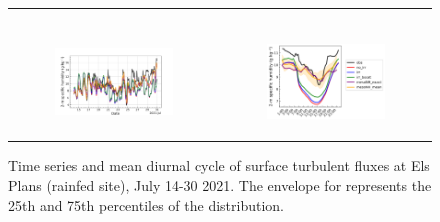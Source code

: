 \begin{figure}[hbtp]
\begin{tabular}{cc}
\begin{subfigure}[t]{0.5\textwidth}
        \end{subfigure} \\
        \begin{subfigure}[t]{0.5\textwidth}
            \caption{}
            \includegraphics[width=\textwidth]{images/chap5/SOP_TS_DC/time_series_elsplans_q2m.png}
        \end{subfigure} &
        \begin{subfigure}[t]{0.5\textwidth}
            \caption{}
            \includegraphics[width=\textwidth]{images/chap5/SOP_TS_DC/diurnal_cycle_elsplans_q2m.png}
        \end{subfigure}
    \end{tabular}
    \caption{Time series and mean diurnal cycle of surface turbulent fluxes at Els Plans (rainfed site), July 14-30 2021. The envelope for \mesomean represents the 25th and 75th percentiles of the distribution.}
    \label{fig:elsplans_surfacevars}
\end{figure}

\hfill


